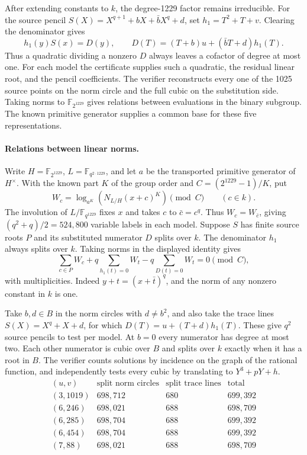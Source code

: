 \documentclass[11pt]{article}
\begin{document}
After extending constants to \(k\), the degree-1229 factor remains
irreducible. For the source pencil
\(S(X)=X^{q+1}+bX+\bar b X^q+d\), set \(h_1=T^2+T+v\).
Clearing the denominator gives
\[
 h_1(y)S(x)=D(y),\qquad D(T)=(T+b)u+(\bar bT+d)h_1(T).
\]
Thus a quadratic dividing a nonzero \(D\) always leaves a
cofactor of degree at most one. For each model the certificate
supplies such a quadratic, the residual linear root, and the
pencil coefficients. The verifier reconstructs every one of the
1025 source points on the norm circle and the full cubic on the
substitution side. Taking norms to \(\mathbb F_{2^{1229}}\) gives
relations between evaluations in the binary subgroup. The
known primitive generator supplies a common base for these five
representations.

\paragraph{Relations between linear norms.}
Write \(H=\mathbb F_{2^{1229}}\), \(L=\mathbb F_{q^{2\cdot1229}}\),
and let \(a\) be the transported primitive generator of \(H^\times\).
With the known part \(K\) of the group order and \(C=(2^{1229}-1)/K\), put
\[
 W_c=\log_{a^K}\!\left(N_{L/H}(x+c)^K\right)\pmod C
 \qquad(c\in k).
\]
The involution of \(L/\mathbb F_{q^{1229}}\) fixes \(x\) and takes
\(c\) to \(\bar c=c^q\). Thus \(W_c=W_{\bar c}\), giving
\((q^2+q)/2=524{,}800\) variable labels in each model. Suppose
\(S\) has finite source roots \(P\) and its substituted numerator
\(D\) splits over \(k\). The denominator \(h_1\) always splits
over \(k\). Taking norms in the displayed identity gives
\[
  \sum_{c\in P} W_c+q\sum_{h_1(t)=0}W_t-q\sum_{D(t)=0}W_t=0
  \pmod C,
\]
with multiplicities. Indeed \(y+t=(x+\bar t)^q\), and the norm
of any nonzero constant in \(k\) is one.

Take \(b,d\in B\) in the norm circles with \(d\ne b^2\), and
also take the trace lines \(S(X)=X^q+X+d\), for which
\(D(T)=u+(T+d)h_1(T)\). These give \(q^2\) source pencils to
test per model. At \(b=0\) every numerator has degree at most two.
Each other numerator is cubic over \(B\) and splits over \(k\)
exactly when it has a root in \(B\). The verifier counts solutions
by incidence on the graph of the rational function, and independently
tests every cubic by translating to \(Y^3+pY+h\).
\[
\begin{array}{c|r|r|r}
 (u,v)&\text{split norm circles}&\text{split trace lines}&\text{total}\\\hline
 (3,1019)&698{,}712&680&699{,}392\\
 (6,246)&698{,}021&688&698{,}709\\
 (6,285)&698{,}704&688&699{,}392\\
 (6,454)&698{,}704&688&699{,}392\\
 (7,88)&698{,}021&688&698{,}709
\end{array}
\]
\end{document}
